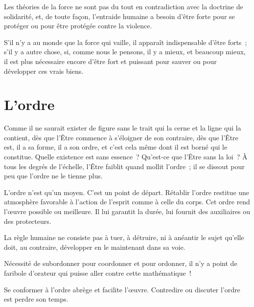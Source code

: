 \documentclass[french,twoside]{book} %
\newcommand{\astermono}{\medskip\centerline{\color{rubric}\large\selectfont{\syms ✻}}\medskip\par}%
\begin{document}
\astermono

\noindent Les théories de la force ne sont pas du tout en contradiction avec la doctrine de solidarité, et, de toute façon, l’entraide humaine a besoin d’être forte pour se protéger ou pour être protégée contre la violence.\par
S’il n’y a au monde que la force qui vaille, il apparaît indispensable d’être forts ; s’il y a autre chose, si, comme nous le pensons, il y a mieux, et beaucoup mieux, il est plus nécessaire encore d’être fort et puissant pour sauver ou pour développer ces vrais biens.
\section[L’ordre]{L’ordre}
\noindent Comme il ne saurait exister de figure sans le trait qui la cerne et la ligne qui la contient, dès que l’Être commence à s’éloigner de son contraire, dès que l’Être est, il a sa forme, il a son ordre, et c’est cela même dont il est borné qui le constitue. Quelle existence est sans essence ? Qu’est-ce que l’Être sans la loi ? À tous les degrés de l’échelle, l’Être faiblit quand mollit l’ordre ; il se dissout pour peu que l’ordre ne le tienne plus.\par

\astermono

\noindent L’ordre n’est qu’un moyen. C’est un point de départ. Rétablir l’ordre restitue une atmosphère favorable à l’action de l’esprit comme à celle du corps. Cet ordre rend l’œuvre possible ou meilleure. Il lui garantit la durée, lui fournit des auxiliaires ou des protecteurs.\par

\astermono

\noindent La règle humaine ne consiste pas à tuer, à détruire, ni à anéantir le sujet qu’elle doit, au contraire, développer en le maintenant dans sa voie.\par

\astermono

\noindent Nécessité de subordonner pour coordonner et pour ordonner, il n’y a point de faribole d’orateur qui puisse aller contre cette mathématique !\par

\astermono

\noindent Se conformer à l’ordre abrège et facilite l’œuvre. Contredire ou discuter l’ordre est perdre son temps.\par

\astermono
\end{document}
